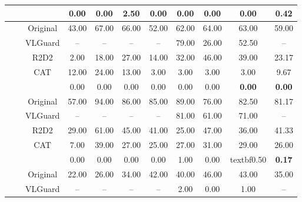\begin{table*}[t]
{\begin{tabular}{c|c|c|cc|cc|cc||cc}
    && & 0.00 &	0.00 &	2.50	& 0.00 &	0.00 &	0.00 &\textbf{0.00}&\textbf{0.42}	
    \\\hline\hline


    & & {Original} &43.00 &67.00  &66.00&52.00   &62.00 &64.00 &63.00&59.00  \\
    && VLGuard&-- &--  &--&--  &79.00&26.00&52.50&--  \\
    && R2D2  & 2.00&18.00   &27.00&14.00   &32.00 &46.00 &39.00&23.17\\
    && CAT &12.00 & 24.00 &13.00&3.00   &3.00 &3.00 &3.00& 9.67\\ 
    &&  &0.00 &0.00  &0.00&0.00   &0.00 &0.00 &\textbf{0.00}&\textbf{0.00}  \\
    & & {Original}&57.00&94.00  &86.00&85.00   &89.00 &76.00 &82.50&81.17  \\
   && VLGuard&-- &--  &--&--   &81.00&61.00&71.00&--  \\
    && R2D2 & 29.00& 61.00 &45.00& 41.00  &25.00 & 47.00& 36.00&41.33 \\
    && CAT & 7.00& 39.00 &27.00& 25.00  &27.00&31.00 &29.00&26.00  \\
    &&  &0.00 & 0.00 &0.00&0.00  &1.00 &0.00 &textbf{0.50}&\textbf{0.17}
    \\\hline\hline

    & & {Original}&22.00&26.00  &34.00&42.00   &40.00 &46.00 & 43.00&35.00 \\
   && VLGuard&-- &--  &--&--   &2.00&0.00&1.00&--  \\
    

\end{tabular}}
\end{table*}

